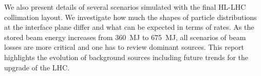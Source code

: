 We also present details of several scenarios simulated with the final HL-LHC collimation layout. We investigate how much the shapes of particle distributions at the interface plane differ and what can be expected in terms of rates. As the stored beam energy increases from 360~MJ to 675~MJ, all scenarios of beam losses are more critical and one has to review dominant sources. This report highlights the evolution of background sources including future trends for the upgrade of the LHC.


